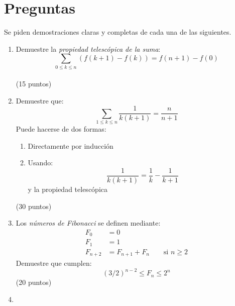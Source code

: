 \documentclass[spanish, fleqn]{article}
\title{Estructuras Discretas \\
       Tarea \#\num \\
       ``Demostrando y contando''}
\author{Funda Dream Team}
\date{19 de abril de 2015}
\begin{document}
\maketitle
\thispagestyle{empty}

\section*{Preguntas}

  Se piden demostraciones claras y completas de cada una de las siguientes.

  \begin{enumerate}
  \item
    Demuestre la \emph{propiedad telescópica de la suma}:
    \begin{equation*}
      \sum_{0 \le k \le n} (f(k + 1) - f(k))
	= f(n + 1) - f(0)
    \end{equation*}
    \\ \hspace*{\fill}(15 puntos)
  \item
    Demuestre que:
    \begin{equation*}
      \sum_{1 \le k \le n} \frac{1}{k (k + 1)}
	= \frac{n}{n + 1}
    \end{equation*}
    Puede hacerse de dos formas:
    \begin{enumerate}
    \item
      Directamente por inducción
    \item
      Usando:
      \begin{equation*}
	\frac{1}{k (k + 1)}
	  = \frac{1}{k} - \frac{1}{k + 1}
      \end{equation*}
      y la propiedad telescópica
    \end{enumerate}
    \hspace*{\fill}(30 puntos)
  \item
    Los \emph{números de Fibonacci} se definen mediante:
    \begin{align*}
      F_0
	&= 0 \\
      F_1
	&= 1 \\
      F_{n + 2}
	&= F_{n + 1} + F_n
	   \qquad\text{si \(n \ge 2\)}
    \end{align*}
    Demuestre que cumplen:
    \begin{equation*}
      \left( 3/2 \right)^{n - 2}
	 \le F_n
	 \le 2^n
    \end{equation*}
    \hspace*{\fill}(20 puntos)
  \item

\end{enumerate}
\end{document}
